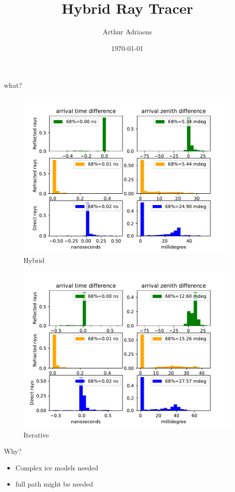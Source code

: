 \documentclass{beamer}
\title{Hybrid Ray Tracer}
\author{Arthur Adriaens}
\date{\today}
\begin{document}
\begin{frame}
	\titlepage
\end{frame}
\begin{frame}{what?}
	\begin{minipage}{0.49\textwidth}
	\begin{figure}
		\centering
		\includegraphics[width=\textwidth]{figures/hybrid_comparison_N_500.pdf}
		\caption{Hybrid}
	\end{figure}
	\end{minipage}
	\begin{minipage}{0.49\textwidth}
	\begin{figure}
		\centering
		\includegraphics[width=\textwidth]{figures/iterative_comparison_N_500.pdf}
		\caption{Iterative}
	\end{figure}
	\end{minipage}
\end{frame}
\begin{frame}{Why?}
	\begin{itemize}
		\item Complex ice models needed
		\item full path might be needed
	\end{itemize}
\end{frame}
\end{document}
